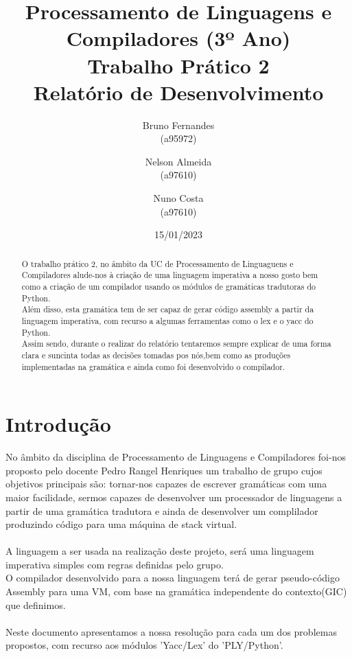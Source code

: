 \documentclass[11pt,a4paper]{report}%
\title{Processamento de Linguagens e Compiladores (3º Ano)\\
       \textbf{Trabalho Prático 2}\\ Relatório de Desenvolvimento
       }
\author{Bruno Fernandes\\ (a95972) \and Nelson Almeida\\ (a97610)
         \and Nuno Costa\\ (a97610)
       }
\date{15/01/2023}
\begin{document}
\maketitle %


\begin{abstract}  %
\par O trabalho prático 2, no âmbito da UC de Processamento de Linguaguens e Compiladores alude-nos à criação de uma linguagem imperativa a nosso gosto bem como a criação de um compilador usando  os módulos de gramáticas tradutoras do Python. \\ 
  Além disso, esta gramática tem de ser capaz de gerar código assembly a partir da linguagem imperativa, com recurso a algumas ferramentas como o lex e o yacc do Python. \\
 Assim sendo, durante o realizar do relatório tentaremos sempre explicar de uma forma clara e suncinta todas as decisões tomadas pos nós,bem como as produções implementadas na gramática e ainda como foi desenvolvido o compilador.
\end{abstract}


\tableofcontents


\chapter{Introdução} \label{chap:intro} %
No âmbito da disciplina de Processamento de Linguagens e Compiladores foi-nos proposto pelo docente Pedro Rangel Henriques um trabalho de grupo cujos objetivos principais são: tornar-nos capazes de escrever gramáticas com uma maior facilidade, sermos capazes de desenvolver um processador de linguagens a partir de uma gramática tradutora e ainda de desenvolver um complilador produzindo código para uma máquina de stack virtual.
\\
\\
A linguagem a ser usada na realização deste projeto, será uma linguagem imperativa simples com regras definidas pelo grupo. 
\\
O compilador desenvolvido para a nossa linguagem terá de gerar pseudo-código Assembly para uma VM, com base na gramática independente do contexto(GIC) que definimos.
\\
\\
Neste documento apresentamos a nossa resolução para cada um dos problemas propostos, com recurso aos módulos 'Yacc/Lex' do 'PLY/Python'.
\end{document}
